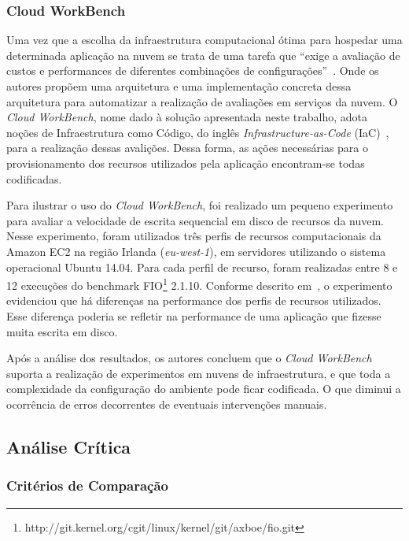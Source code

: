 \subsubsection{Cloud WorkBench}
Uma vez que a escolha da infraestrutura computacional ótima para hospedar uma determinada aplicação na nuvem se trata de uma tarefa que ``exige a avaliação de custos e performances de diferentes combinações de configurações''~\cite{scheuner2014cloud}. Onde os autores propõem uma arquitetura e uma implementação concreta dessa arquitetura para automatizar a realização de avaliações em serviços da nuvem. O {\em Cloud WorkBench}, nome dado à solução apresentada neste trabalho, adota noções de Infraestrutura como Código, do inglês {\em Infrastructure-as-Code} (IaC)~\cite{huttermann2012devops}, para a realização dessas avalições. Dessa forma, as ações necessárias para o provisionamento dos recursos utilizados pela aplicação encontram-se todas codificadas.

Para ilustrar o uso do \textit{Cloud WorkBench}, foi realizado um pequeno experimento para avaliar a velocidade de escrita sequencial em disco de recursos da nuvem. Nesse experimento, foram utilizados três perfis de recursos computacionais da Amazon EC2 na região Irlanda (\textit{eu-west-1}), em servidores utilizando o sistema operacional Ubuntu 14.04. Para cada perfil de recurso, foram realizadas entre 8 e 12 execuções do benchmark FIO\footnote{http://git.kernel.org/cgit/linux/kernel/git/axboe/fio.git} 2.1.10. Conforme descrito em~\cite{scheuner2014cloud}, o experimento evidenciou que há diferenças na performance dos perfis de recursos utilizados. Esse diferença poderia se refletir na performance de uma aplicação que fizesse muita escrita em disco.

Após a análise dos resultados, os autores concluem que o \textit{Cloud WorkBench} suporta a realização de experimentos em nuvens de infraestrutura, e que toda a complexidade da configuração do ambiente pode ficar codificada. O que diminui a ocorrência de erros decorrentes de eventuais intervenções manuais.

\subsection{Análise Crítica}

\subsubsection{Critérios de Comparação}

